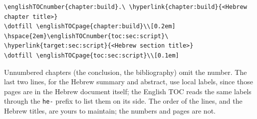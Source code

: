\begin{lstlisting}
\englishTOCnumber{chapter:build}.\ \hyperlink{chapter:build}{<Hebrew chapter title>}
\dotfill \englishTOCpage{chapter:build}\\[0.2em]
\hspace{2em}\englishTOCnumber{toc:sec:script}\ \hyperlink{target:sec:script}{<Hebrew section title>}
\dotfill \englishTOCpage{toc:sec:script}\\[0.1em]
\end{lstlisting}

Unnumbered chapters (the conclusion, the bibliography) omit the number.
The last two lines, for the Hebrew summary and abstract, use local labels, since those pages are in the Hebrew document itself; the English TOC reads the same labels through the \texttt{he-} prefix to list them on its side.
The order of the lines, and the Hebrew titles, are yours to maintain; the numbers and pages are not.
